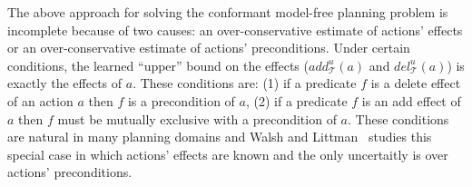 \documentclass[letterpaper]{article}
\begin{document}
 The above approach for solving the conformant model-free planning problem is incomplete because of two causes: an over-conservative estimate of actions' effects or an over-conservative estimate of actions' preconditions. Under certain conditions, the learned ``upper'' bound on the effects ($add_\mathcal{T}^u(a)$ and $del_\mathcal{T}^u(a)$) is exactly the effects of $a$. These conditions are:
 (1) if a predicate $f$ is a delete effect of an action $a$ then $f$ is a precondition of $a$, 
 (2) if a predicate $f$ is an add effect of $a$ then $f$ must be mutually exclusive with a precondition of $a$. 
 These conditions are natural in many planning domains and Walsh and Littman~ studies this special case in which actions' effects are known and the only uncertaitly is over actions' preconditions. 
 
    
\end{document}
